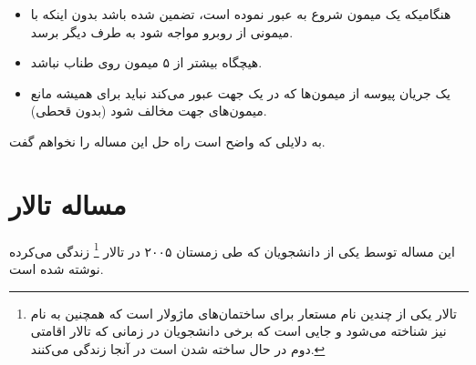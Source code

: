 \documentclass{book}
\begin{document}
\begin{itemize}

\item 
    هنگامیکه یک میمون شروع به عبور نموده است، تضمین شده باشد بدون اینکه با میمونی از روبرو مواجه شود به طرف دیگر برسد. 

\item %
    هیچگاه بیشتر از ۵ میمون روی طناب نباشد. 

\item %
    یک جریان پیوسه از میمون‌ها که در یک جهت عبور می‌کند نباید برای همیشه مانع میمون‌های جهت مخالف شود (بدون قحطی). 

\end{itemize}

    به دلایلی که واضح است راه حل این مساله را نخواهم گفت. 


\section{مساله تالار  }

    این مساله توسط  یکی از دانشجویان  که طی زمستان ۲۰۰۵ در تالار \footnote{
    تالار  یکی از چندین نام مستعار برای ساختمان‌های ماژولار است که همچنین به نام  نیز شناخته می‌شود و جایی است که 
    برخی دانشجویان در زمانی که تالار اقامتی دوم در حال ساخته شدن است در آنجا زندگی می‌کنند. 
    } زندگی می‌کرده نوشته شده است. 
\end{document}
